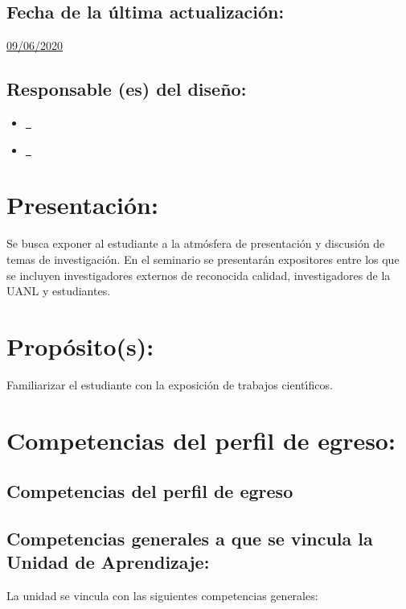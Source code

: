 \documentclass[10 pt]{article}
\begin{document}
\subsection{Fecha de la \'{u}ltima actualizaci\'{o}n:} \underline{09/06/2020}
\subsection{Responsable (es) del dise\~{n}o:}
\begin{itemize}[label={}]
\item \underline{\ncesar~\cesar}
\item \underline{\nelisa~\elisa}
\end{itemize}
\newpage
\section{Presentaci\'{o}n:}

Se busca exponer al estudiante a la atm\'{o}sfera de presentaci\'{o}n y
discusi\'{o}n de temas de investigaci\'{o}n. En el seminario se presentar\'{a}n
expositores entre los que se incluyen investigadores externos de
reconocida calidad, investigadores de la UANL y estudiantes.


\section{Prop\'{o}sito(s):}

Familiarizar el estudiante con la exposici\'{o}n de trabajos cient\'{\i}ficos.


\section{Competencias del perfil de egreso:}
\subsection{Competencias del perfil de egreso}






  
\subsection{Competencias generales a que se vincula la Unidad de
    Aprendizaje:}

  La unidad se vincula con las siguientes competencias generales:
\end{document}
